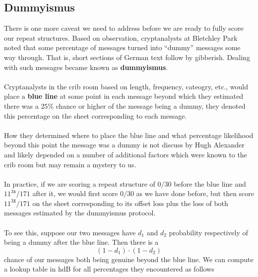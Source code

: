 \subsection{Dummyismus}
There is one more caveat we need to address before we are ready to
fully score our repeat structures. Based on observation,
cryptanalysts at Bletchley Park noted that some percentage of
messages turned into ``dummy'' messages some way through. That is,
short sections of German text follow by gibberish. Dealing with
such messages became known as {\bf{dummyismus}}.
\\\\Cryptanalysts in the crib room  based on length, frequency,
cateogry, etc., would place a {\bf{blue line}} at some point in
each message beyond which they estimated there was a $25\%$ chance
or higher of the message being a dummy, they denoted this
percentage on the sheet corresponding to each message.
\\\\How they determined where to place the blue line and what
percentage likelihood beyond this point the message was a dummy is
not discuss by Hugh Alexander and likely depended on a number of
additional factors which were known to the crib room but may remain
a mystery to us.
\\\\In practice, if we are scoring a repeat structure of $0/30$
before the blue line and $11^{3\texttt{x}}/171$ after it, we would
first score $0/30$ as we have done before, but then score
$11^{3\texttt{X}}/171$ on the sheet corresponding to its offset
loss plus the loss of both messages estimated by the dummyismus protocol.
\\\\To see this, suppose our two messages have $d_1$ and $d_2$
probability respectively of being a dummy after the blue line. Then there is a
\[
	(1-d_1)\cdot(1-d_2)
\]
chance of our messages both being genuine beyond the blue line. We
can compute a lookup table in hdB for all percentages they
encountered as follows
